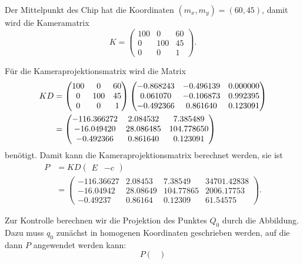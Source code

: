 \begin{loesung}
\begin{teilaufgaben}
\item Der Mittelpunkt des Chip hat die Koordinaten $(m_x,m_y)=(60,45)$,
damit wird die Kameramatrix
\[
K
=
\begin{pmatrix}
100&  0&60\\
  0&100&45\\
  0&  0& 1
\end{pmatrix}.
\]
\item Für die Kameraprojektionsmatrix wird die Matrix
\begin{align}
KD
&=
\begin{pmatrix}
100&  0&60\\
  0&100&45\\
  0&  0& 1
\end{pmatrix}
\begin{pmatrix}
  -0.868243& -0.496139&  0.000000\\
   0.061070& -0.106873&  0.992395\\
  -0.492366&  0.861640&  0.123091
\end{pmatrix}
\notag
\\
&=
\begin{pmatrix}
  -116.366272&     2.084532&     7.385489\\
   -16.049420&    28.086485&   104.778650\\
    -0.492366&     0.861640&     0.123091
\end{pmatrix}
\label{40000050:kd}
\end{align}
benötigt.
Damit kann die Kameraprojektionsmatrix berechnet werden, sie ist
\begin{align*}
P
&=
KD\begin{pmatrix}E&-c\end{pmatrix}
\\
&=
\begin{pmatrix}
  -116.36627&  2.08453&   7.38549& 34701.42838\\
   -16.04942& 28.08649& 104.77865&  2006.17753\\
    -0.49237&  0.86164&   0.12309&    61.54575
\end{pmatrix}.
\end{align*}
\item
Zur Kontrolle berechnen wir die Projektion des Punktes $Q_0$ durch die
Abbildung. 
Dazu muss $q_0$ zunächst in homogenen Koordinaten geschrieben werden,
auf die dann $P$ angewendet werden kann:
\[
P
\begin{pmatrix}

\end{pmatrix}\]
\end{teilaufgaben}
\end{loesung}
